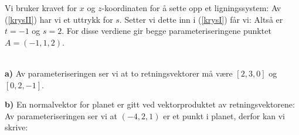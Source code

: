 %


\usepackage{xr}


 

Vi bruker kravet for $ x $ og $ z $-koordinaten for å sette opp et ligningssystem:
Av (\ref{krysII}) har vi et uttrykk for $ s $. Setter vi dette inn i (\ref{krysI}) får vi:
Altså er $ t=-1 $ og $ s=2 $. For disse verdiene gir begge parameteriseringene punktet $ A=(-1, 1, 2) $.

 

 

 

\\
\textbf{a)} Av parameteriseringen ser vi at to retningsvektorer må være $ [2, 3, 0] $ og $ [0, 2, -1] $. 

\textbf{b)} En normalvektor for planet er gitt ved vektorproduktet av retningsvektorene:
Av parameteriseringen ser vi at $ (-4, 2, 1) $ er et punkt i planet, derfor kan vi skrive:

